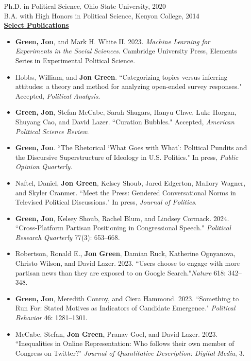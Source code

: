 \documentclass{article}
\begin{document}
\noindent Ph.D. in Political Science, Ohio State University, 2020 \\
\noindent B.A. with High Honors in Political Science, Kenyon College, 2014 \\

\noindent \textbf{\underline{Select Publications}}
	\begin{itemize}
		\item \textbf{Green, Jon}, and Mark H. White II. 2023. \textit{Machine Learning for Experiments in the Social Sciences.} Cambridge University Press, Elements Series in Experimental Political Science.
		\item  Hobbs, William, and \textbf{Jon Green}. ``Categorizing topics versus inferring attitudes: a theory and method for analyzing open-ended survey responses." Accepted, \textit{Political Analysis}.
		\item \textbf{Green, Jon}, Stefan McCabe, Sarah Shugars, Hanyu Chwe, Luke Horgan, Shuyang Cao, and David Lazer. ``Curation Bubbles."  Accepted, \textit{American Political Science Review}.
		\item \textbf{Green, Jon}. ``The Rhetorical `What Goes with What': Political Pundits and the Discursive Superstructure of Ideology in U.S. Politics." In press, \textit{Public Opinion Quarterly}.
		\item Naftel, Daniel, \textbf{Jon Green}, Kelsey Shoub, Jared Edgerton, Mallory Wagner, and Skyler Cranmer. ``Meet the Press: Gendered Conversational Norms in Televised Political Discussions."  In press, \textit{Journal of Politics}.
		\item \textbf{Green, Jon}, Kelsey Shoub, Rachel Blum, and Lindsey Cormack. 2024. ``Cross-Platform Partisan Positioning in Congressional Speech." \textit{Political Research Quarterly} 77(3): 653–668.
		\item Robertson, Ronald E., \textbf{Jon Green}, Damian Ruck, Katherine Ognyanova, Christo Wilson, and David Lazer. 2023. ``Users choose to engage with more partisan news than they are exposed to on Google Search."\textit{Nature} 618: 342–348.
		\item \textbf{Green, Jon}, Meredith Conroy, and Ciera Hammond. 2023. ``Something to Run For: Stated Motives as Indicators of Candidate Emergence." \textit{Political Behavior} 46: 1281–1301.
		\item McCabe, Stefan, \textbf{Jon Green}, Pranav Goel, and David Lazer. 2023. ``Inequalities in Online Representation: Who follows their own member of Congress on Twitter?" \textit{Journal of Quantitative Description: Digital Media}, 3.

\end{itemize}
\end{document}
